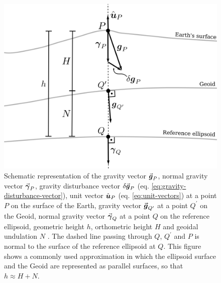 \documentclass[extra]{gji}
\newcommand{\versor}[1]{\hat{\mitbf{#1}}}
\renewcommand{\vector}[1]{\vec{\mitbf{#1}}}
\begin{document}
\begin{figure}
    \includegraphics{figures/surfaces.png}
    \caption{Schematic representation of the gravity vector
        $\vector{g}_{P}$, normal gravity vector $\vector{\gamma}_{P}$,
        gravity disturbance vector $\delta \vector{g}_{P}$
        (eq. \ref{eq:gravity-disturbance-vector}), unit vector
        $\versor{u}_{P}$ (eq. \ref{eq:unit-vectors}) at a point $P$
        on the surface of the Earth, gravity vector $\vector{g}_{Q^{\prime}}$
        at a point $Q^{\prime}$ on the Geoid, normal gravity vector
        $\vector{\gamma}_{Q}$ at a point $Q$ on the reference ellipsoid,
        geometric height $h$, orthometric height $H$ and geoidal undulation
        $N$ \citep{heiskanen-moritz1967}.
        The dashed line passing through
        $Q$, $Q^{\prime}$ and $P$ is normal to the
        surface of the reference ellipsoid at $Q$. This figure
        shows a commonly used approximation in which the ellipsoid
        surface and the Geoid are represented as parallel surfaces,
        so that $h \approx H + N$.}
  \label{fig:surfaces}
\end{figure}

\label{lastpage}
\end{document}
